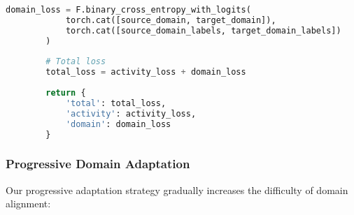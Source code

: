 \documentclass[journal]{IEEEtran}
\begin{document}
\begin{lstlisting}[language=Python, caption=Domain-Adversarial Training Framework]
        domain_loss = F.binary_cross_entropy_with_logits(
            torch.cat([source_domain, target_domain]),
            torch.cat([source_domain_labels, target_domain_labels])
        )
        
        # Total loss
        total_loss = activity_loss + domain_loss
        
        return {
            'total': total_loss,
            'activity': activity_loss,
            'domain': domain_loss
        }
\end{lstlisting}

\subsubsection{Progressive Domain Adaptation}

Our progressive adaptation strategy gradually increases the difficulty of domain alignment:
\end{document}
